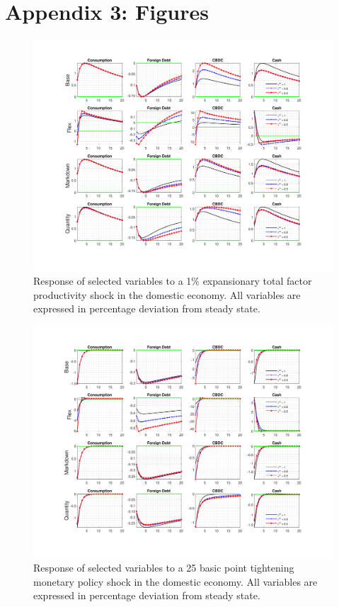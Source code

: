\documentclass[12pt, a4paper]{article}
\begin{document}
\section{Appendix 3: Figures}
\begin{figure}[H]
    \hspace{-0.1cm}
	\centering
	\centerline{\includegraphics[trim = 0mm 23mm 0mm 18mm, clip, scale=0.93]{TFP_sto.pdf}}
	\caption{Response of selected variables to a 1\% expansionary total factor productivity shock in the domestic economy. All variables are expressed in percentage deviation from steady state.}
	\label{TFP_sto}
\end{figure}
\begin{figure}[H]
  \hspace{-0.1cm}
	\centering
	\centerline{\includegraphics[trim = 0mm 23mm 0mm 18mm, clip, scale=0.93]{monetary_sto.pdf}}
	\caption{Response of selected variables to a 25 basic point tightening monetary policy shock in the domestic economy. All variables are expressed in percentage deviation from steady state.}
	\label{monalt_sto}
\end{figure}
\end{document}
